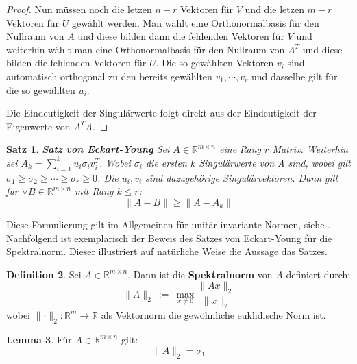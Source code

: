 \documentclass{article}
\newcommand{\R}[0]{\mathbb{R}}
\theoremstyle{plain}
\newtheorem{thm}{Satz}[section]
\theoremstyle{definition}
\newtheorem{defin}[thm]{Definition}
\newtheorem{lemma}[thm]{Lemma}
\begin{document}
\begin{proof}
    Nun müssen noch die letzen $n - r$ Vektoren für $V$ und die letzen $m - r$ Vektoren für $U$ gewählt werden.
    Man wählt eine Orthonormalbasis für den Nullraum von $A$ und diese bilden dann die fehlenden Vektoren für $V$ 
    und weiterhin wählt man eine Orthonormalbasis für den Nullraum von $A^T$ und diese bilden die fehlenden Vektoren für $U$.
    Die so gewählten Vektoren $v_i$ sind automatisch orthogonal zu den bereits gewählten $v_1, \cdots, v_r$ 
    und dasselbe gilt für die so gewählten $u_i$.

    Die Eindeutigkeit der Singulärwerte folgt direkt aus der Eindeutigkeit der Eigenwerte von $A^TA$.
\end{proof}

\begin{thm} \textbf{Satz von Eckart-Young} \cite[S. 58f.]{strang2019linear}
    Sei $A \in \R^{m\times n}$ eine Rang $r$ Matrix. Weiterhin sei $A_k = \sum\limits_{i=1}^k u_i\sigma_iv_i^T$. 
    Wobei $\sigma_i$ die ersten $k$ Singulärwerte von A sind, wobei gilt $\sigma_1 \geq \sigma_2 \geq \cdots \geq \sigma_r \geq 0$. Die $u_i, v_i$ sind dazugehörige Singulärvektoren. 
    Dann gilt für $\forall B \in \R^{m \times n}$ mit Rang $k \leq r$:
    \begin{equation}
        \lVert A - B \rVert \geq \lVert A - A_k \rVert
    \end{equation}
\end{thm}

Diese Formulierung gilt im Allgemeinen für unitär invariante Normen, siehe \cite[S. 53, Kapitel 3]{mirsky1960symmetric}.
Nachfolgend ist exemplarisch der Beweis des Satzes von Eckart-Young für die Spektralnorm.
Dieser illustriert auf natürliche Weise die Aussage das Satzes.

\begin{defin}
    Sei $A \in \R^{m \times n}$. Dann ist die \textbf{Spektralnorm} von $A$ definiert durch:
    \begin{equation}
        \lVert A \rVert_2 \: := \: \max\limits_{x \neq 0} \frac{\lVert Ax \rVert_2}{\lVert x \rVert_2}
    \end{equation}
    wobei $\lVert \cdot \rVert_2: \R^m \to \R$ als Vektornorm die gewöhnliche euklidische Norm ist.
\end{defin}

\begin{lemma}
    Für $A \in \R^{m \times n}$ gilt:
    \begin{equation}
        \lVert A \rVert_2 = \sigma_1
    \end{equation}
\end{lemma}
\end{document}
